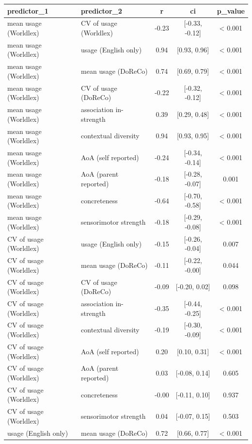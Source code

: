 \begin{tabular}{llccc}
  \hline
predictor_1 & predictor_2 & r & ci & p_value \\ 
  \hline
mean usage (Worldlex) & CV of usage (Worldlex) & -0.23 & [-0.33, -0.12] & < 0.001 \\ 
  mean usage (Worldlex) & usage (English only) & 0.94 & [0.93, 0.96] & < 0.001 \\ 
  mean usage (Worldlex) & mean usage (DoReCo) & 0.74 & [0.69, 0.79] & < 0.001 \\ 
  mean usage (Worldlex) & CV of usage (DoReCo) & -0.22 & [-0.32, -0.12] & < 0.001 \\ 
  mean usage (Worldlex) & association in-strength & 0.39 & [0.29, 0.48] & < 0.001 \\ 
  mean usage (Worldlex) & contextual diversity & 0.94 & [0.93, 0.95] & < 0.001 \\ 
  mean usage (Worldlex) & AoA (self reported) & -0.24 & [-0.34, -0.14] & < 0.001 \\ 
  mean usage (Worldlex) & AoA (parent reported) & -0.18 & [-0.28, -0.07] & 0.001 \\ 
  mean usage (Worldlex) & concreteness & -0.64 & [-0.70, -0.58] & < 0.001 \\ 
  mean usage (Worldlex) & sensorimotor strength & -0.18 & [-0.29, -0.08] & < 0.001 \\ 
  CV of usage (Worldlex) & usage (English only) & -0.15 & [-0.26, -0.04] & 0.007 \\ 
  CV of usage (Worldlex) & mean usage (DoReCo) & -0.11 & [-0.22, -0.00] & 0.044 \\ 
  CV of usage (Worldlex) & CV of usage (DoReCo) & -0.09 & [-0.20, 0.02] & 0.098 \\ 
  CV of usage (Worldlex) & association in-strength & -0.35 & [-0.44, -0.25] & < 0.001 \\ 
  CV of usage (Worldlex) & contextual diversity & -0.19 & [-0.30, -0.09] & < 0.001 \\ 
  CV of usage (Worldlex) & AoA (self reported) & 0.20 & [0.10, 0.31] & < 0.001 \\ 
  CV of usage (Worldlex) & AoA (parent reported) & 0.03 & [-0.08, 0.14] & 0.605 \\ 
  CV of usage (Worldlex) & concreteness & -0.00 & [-0.11, 0.10] & 0.937 \\ 
  CV of usage (Worldlex) & sensorimotor strength & 0.04 & [-0.07, 0.15] & 0.503 \\ 
  usage (English only) & mean usage (DoReCo) & 0.72 & [0.66, 0.77] & < 0.001 \\ 

\end{tabular}
